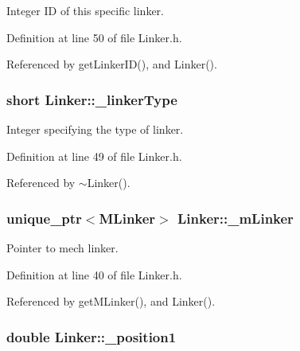 Integer I\+D of this specific linker. 



Definition at line 50 of file Linker.\+h.



Referenced by get\+Linker\+I\+D(), and Linker().

\hypertarget{classLinker_a82213082aecfbbb0e69be04ae9357b68}{
\subsubsection[{\+\_\+linker\+Type}]{\setlength{\rightskip}{0pt plus 5cm}short Linker\+::\+\_\+linker\+Type\hspace{0.3cm}{\ttfamily [private]}}}\label{classLinker_a82213082aecfbbb0e69be04ae9357b68}


Integer specifying the type of linker. 



Definition at line 49 of file Linker.\+h.



Referenced by $\sim$\+Linker().

\hypertarget{classLinker_a0b17c705cb1e5f89777f2675bd857e1c}{
\subsubsection[{\+\_\+m\+Linker}]{\setlength{\rightskip}{0pt plus 5cm}unique\+\_\+ptr$<${\bf M\+Linker}$>$ Linker\+::\+\_\+m\+Linker\hspace{0.3cm}{\ttfamily [private]}}}\label{classLinker_a0b17c705cb1e5f89777f2675bd857e1c}


Pointer to mech linker. 



Definition at line 40 of file Linker.\+h.



Referenced by get\+M\+Linker(), and Linker().

\hypertarget{classLinker_ad16ab7afce0a3a09b455f3407a382bf2}{
\subsubsection[{\+\_\+position1}]{\setlength{\rightskip}{0pt plus 5cm}double Linker\+::\+\_\+position1\hspace{0.3cm}{\ttfamily [private]}}}\label{classLinker_ad16ab7afce0a3a09b455f3407a382bf2}


